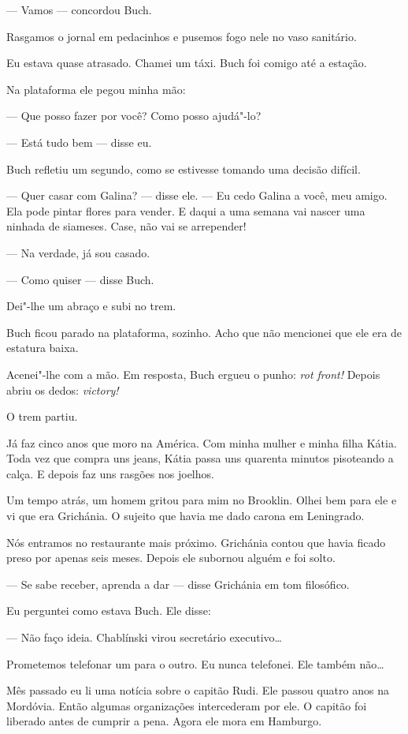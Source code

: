 --- Vamos --- concordou Buch.

Rasgamos o jornal em pedacinhos e pusemos fogo nele no vaso sanitário.

Eu estava quase atrasado. Chamei um táxi. Buch foi comigo até a estação.

Na plataforma ele pegou minha mão:

--- Que posso fazer por você? Como posso ajudá"-lo?

--- Está tudo bem --- disse eu.

Buch refletiu um segundo, como se estivesse tomando uma decisão difícil. \label{ref5}

--- Quer casar com Galina? --- disse ele. --- Eu cedo Galina a você, meu
amigo. Ela pode pintar flores para vender. E daqui a uma semana vai
nascer uma ninhada de siameses. Case, não vai se arrepender!

--- Na verdade, já sou casado.

--- Como quiser --- disse Buch.

Dei"-lhe um abraço e subi no trem.

Buch ficou parado na plataforma, sozinho. Acho que não mencionei que ele
era de estatura baixa.

Acenei"-lhe com a mão. Em resposta, Buch ergueu o punho: \emph{rot
front!} Depois abriu os dedos: \emph{victory!}

O trem partiu.

Já faz cinco anos que moro na América. Com minha mulher e minha filha
Kátia. Toda vez que compra uns jeans, Kátia passa uns quarenta minutos
pisoteando a calça. E depois faz uns rasgões nos joelhos.

Um tempo atrás, um homem gritou para mim no Brooklin. Olhei bem para ele
e vi que era Grichánia. O sujeito que havia me dado carona em
Leningrado.

Nós entramos no restaurante mais próximo. Grichánia contou que havia
ficado preso por apenas seis meses. Depois ele subornou alguém e foi
solto.

--- Se sabe receber, aprenda a dar --- disse Grichánia em tom
filosófico.

Eu perguntei como estava Buch. Ele disse:

--- Não faço ideia. Chablínski virou secretário executivo\ldots{}

Prometemos telefonar um para o outro. Eu nunca telefonei. Ele também
não\ldots{}

Mês passado eu li uma notícia sobre o capitão Rudi. Ele passou quatro
anos na Mordóvia. Então algumas organizações intercederam por ele. O
capitão foi liberado antes de cumprir a pena. Agora ele mora em
Hamburgo.

